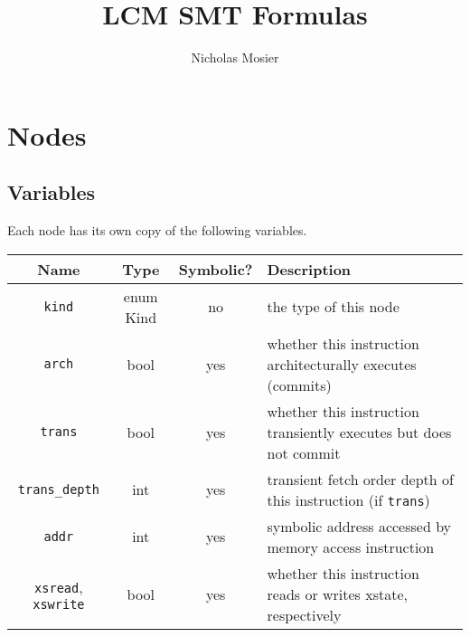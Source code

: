 \documentclass{article}
\title{LCM SMT Formulas}
\author{Nicholas Mosier}
\newcommand{\kind}{\texttt{kind}}
\newcommand{\arch}{\texttt{arch}}
\newcommand{\trans}{\texttt{trans}}
\newcommand{\transdepth}{\texttt{trans\_depth}}
\newcommand{\addr}{\texttt{addr}}
\newcommand{\xsread}{\texttt{xsread}}
\newcommand{\xswrite}{\texttt{xswrite}}
\begin{document}
\maketitle

\section{Nodes}

\subsection{Variables}


Each node has its own copy of the following variables.

\begin{centering}
\begin{tabular}{|c|c|c|l|}\hline
  {\bf Name} & {\bf Type} & {\bf Symbolic?} & {\bf Description} \\\hline
\kind & enum Kind & no & the type of this node \\\hline  
\arch & bool & yes & whether this instruction architecturally executes (commits) \\\hline
\trans & bool & yes & whether this instruction transiently executes but does not commit \\\hline
\transdepth & int & yes & transient fetch order depth of this instruction (if \trans) \\\hline
\addr & int & yes & symbolic address accessed by memory access instruction \\\hline
\xsread, \xswrite{} & bool & yes & whether this instruction reads or writes xstate, respectively \\\hline
\end{tabular}
\end{centering}
\end{document}
